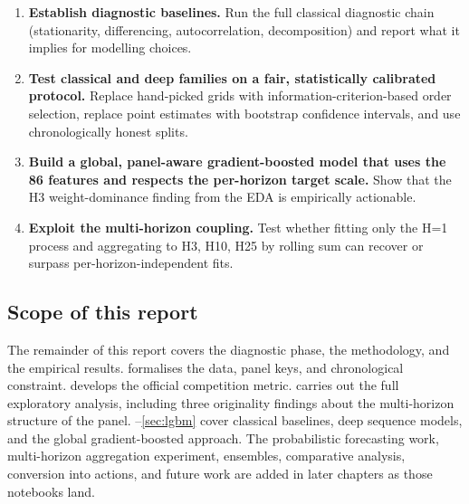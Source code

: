 \begin{enumerate}
  \item \textbf{Establish diagnostic baselines.} Run the full classical diagnostic chain (stationarity, differencing, autocorrelation, decomposition) and report what it implies for modelling choices.
  \item \textbf{Test classical and deep families on a fair, statistically calibrated protocol.} Replace hand-picked grids with information-criterion-based order selection, replace point estimates with bootstrap confidence intervals, and use chronologically honest splits.
  \item \textbf{Build a global, panel-aware gradient-boosted model that uses the 86 features and respects the per-horizon target scale.} Show that the H3 weight-dominance finding from the EDA is empirically actionable.
  \item \textbf{Exploit the multi-horizon coupling.} Test whether fitting only the H=1 process and aggregating to H3, H10, H25 by rolling sum can recover or surpass per-horizon-independent fits.
\end{enumerate}

\subsection{Scope of this report}
\label{sec:intro:scope}

The remainder of this report covers the diagnostic phase, the methodology, and the empirical results.  formalises the data, panel keys, and chronological constraint.  develops the official competition metric.  carries out the full exploratory analysis, including three originality findings about the multi-horizon structure of the panel. --\cref{sec:lgbm} cover classical baselines, deep sequence models, and the global gradient-boosted approach. The probabilistic forecasting work, multi-horizon aggregation experiment, ensembles, comparative analysis, conversion into actions, and future work are added in later chapters as those notebooks land.
